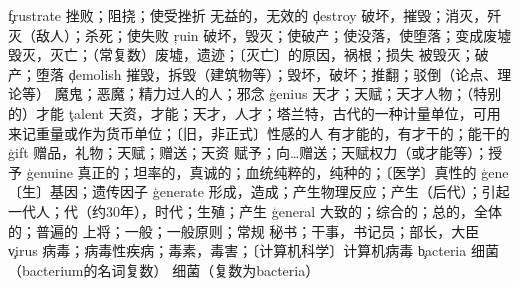 \begin{multicols}{2}
\c{frustrate}  \vt 挫败；阻挠；使受挫折 \a 无益的，无效的
\c{destroy}  \vt 破坏，摧毁；消灭，歼灭（敌人）；杀死；使失败
\c{ruin}  \vt 破坏，毁灭；使破产；使没落，使堕落；变成废墟 \n 毁灭，灭亡；（常复数）废墟，遗迹；〔灭亡〕的原因，祸根；损失 \vi 被毁灭；破产；堕落
\c{demolish}  \vt 摧毁，拆毁（建筑物等）；毁坏，破坏；推翻；驳倒（论点、理论等）
  \n 魔鬼；恶魔；精力过人的人；邪念
\c{genius}  \n 天才；天赋；天才人物；（特别的）才能
\c{talent}  \n 天资，才能；天才，人才；塔兰特，古代的一种计量单位，可用来记重量或作为货币单位；〔旧，非正式〕性感的人
  \a 有才能的，有才干的；能干的
\c{gift}  \n 赠品，礼物；天赋；赠送；天资 \vt 赋予；向…赠送；天赋权力（或才能等）；授予 
\c{genuine}  \a 真正的；坦率的，真诚的；血统纯粹的，纯种的；〔医学〕真性的
\c{gene}  \n 〔生〕基因；遗传因子 
\c{generate}  \vt 形成，造成；产生物理反应；产生（后代）；引起
  \n 一代人；代（约30年），时代；生殖；产生 
\c{general}  \a 大致的；综合的；总的，全体的；普遍的 \n 上将；一般；一般原则；常规 
  \n 秘书；干事，书记员；部长，大臣
\c{virus}  \n 病毒；病毒性疾病；毒素，毒害；〔计算机科学〕计算机病毒
\c{bacteria}  \n 细菌（bacterium的名词复数）
  \n 细菌（复数为bacteria）




\end{multicols}
